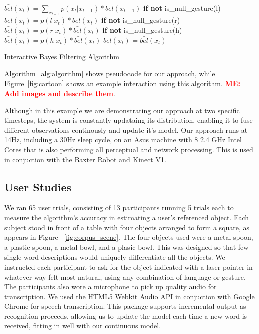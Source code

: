 \documentclass[a4paper, 11pt]{article} %
\newcommand{\menote}[1]{\textcolor{Red}{\textbf{ME: #1}}}
\begin{document}
\begin{algorithm}
    \DontPrintSemicolon
    \BlankLine
    \BlankLine
     {
      $\bar{bel}(x_t) = \displaystyle\sum_{x_{t-1}} p(x_t|x_{t-1})*bel(x_{t-1})$
      \BlankLine
      \textbf{if not} is\_null\_gesture(l)
      \BlankLine
      \Indp$\bar{bel}(x_t) = p(l | x_t) *  \bar{bel}(x_t)$
      \BlankLine
      \Indm\textbf{if not} is\_null\_gesture(r)
      \BlankLine
      \Indp$\bar{bel}(x_t) = p(r | x_t) *  \bar{bel}(x_t)$
      \BlankLine
      \Indm\textbf{if not} is\_null\_gesture(h)
      \BlankLine
      \Indp$\bar{bel}(x_t) = p(h | x_t) *  \bar{bel}(x_t)$
      \BlankLine
      \Indm{}
      $bel(x_t) = \bar{bel}(x_t)$

    }
    \BlankLine
\caption{Interactive Bayes Filtering Algorithm} 
\label{alg:algorithm}
\end{algorithm}

Algorithm~\ref{alg:algorithm} shows pseudocode for our approach, while
Figure~\ref{fig:cartoon} shows an example interaction using this algorithm. \menote{Add images and describe them}.

Although in this example we are demonstrating our approach at two specific timesteps, the system is constantly updataing its distribution, enabling it to fuse different observations continously and update it's model. Our approach runs at 14Hz, including a 30Hz sleep cycle, on an Asus machine with 8 2.4 GHz Intel Cores that is also performing all perceptual and network processing. This is used in conjuction with the Baxter Robot and Kinect V1.
\subsection*{User Studies}
We ran 65 user trials, consisting of 13 participants running 5 trials each to measure the algorithm's accuracy in estimating a user's referenced object. Each subject stood in front of a table with four objects arranged to form a square, as appears in Figure ~\ref{fig:corpus_scene}. The four objects used were a metal spoon, a plastic spoon, a metal bowl, and a plasic bowl. This was designed so that few single word descriptions would uniquely differentiate all the objects. We instructed each participant to ask for the object indicated with a laser pointer in whatever way felt most natural, using any combination of language or gesture. The participants also wore a microphone to pick up quality audio for transcription. We used the HTML5 Webkit Audio API in conjuction with Google Chrome for speech transcription. This package supports incremental output as recognition proceeds, allowing us to update the model each time a new word is received, fitting in well with our continuous model.
\end{document}
